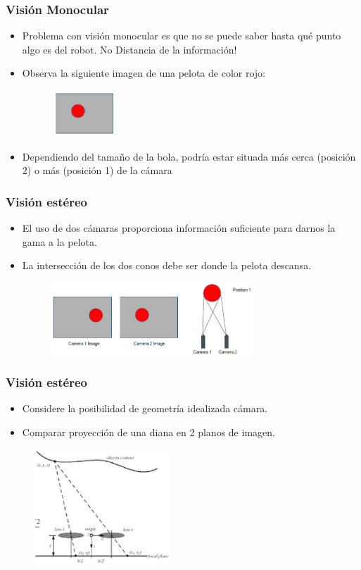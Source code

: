 \documentclass{beamer}
\begin{document}
\begin{frame}
\frametitle{Visión Monocular}
\begin{itemize}
\item Problema con visión monocular es que no se puede saber hasta qué punto algo es del robot. No 
Distancia de la información!
\item Observa la siguiente imagen de una pelota de color rojo:
\begin{figure}[!h]
\centering
\includegraphics[width=1in]{vision1}
\end{figure}
\item Dependiendo del tamaño de la bola, podría estar situada más cerca (posición 2) o más (posición 1) de 
la cámara
\end{itemize}
\end{frame}

\begin{frame}
\frametitle{Visión estéreo}
\begin{itemize}
\item El uso de dos cámaras proporciona información suficiente para darnos la gama a la pelota.
\item La intersección de los dos conos debe ser donde la pelota descansa.
\begin{figure}[!h]
\centering
\includegraphics[width=3in]{vision2}
\end{figure}
\end{itemize}
\end{frame}

\begin{frame}
\frametitle{Visión estéreo}
\begin{itemize}
\item Considere la posibilidad de geometría idealizada cámara.
\item Comparar proyección de una diana en 2 planos de imagen.
\end{itemize}
\begin{figure}[!h]
\centering
\includegraphics[width=2in]{stereo0}
\end{figure}
\end{frame}
\end{document}
